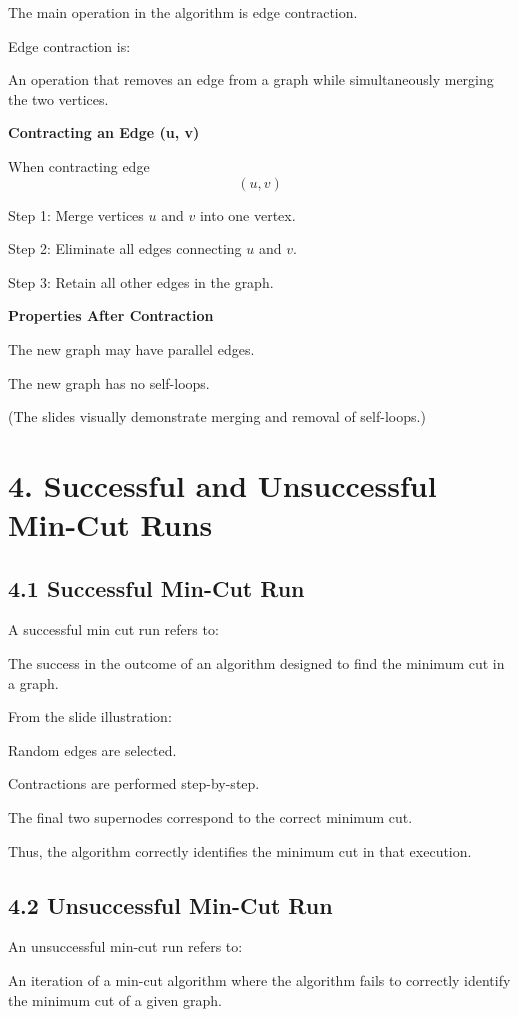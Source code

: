 \documentclass[11pt]{article}
\begin{document}
The main operation in the algorithm is edge contraction.

Edge contraction is:

An operation that removes an edge from a graph while simultaneously merging the two vertices.

\textbf{Contracting an Edge (u, v)}

When contracting edge
\[
(u,v)
\]

Step 1: Merge vertices $u$ and $v$ into one vertex.

Step 2: Eliminate all edges connecting $u$ and $v$.

Step 3: Retain all other edges in the graph.

\textbf{Properties After Contraction}

The new graph may have parallel edges.

The new graph has no self-loops.

(The slides visually demonstrate merging and removal of self-loops.)

\section*{4. Successful and Unsuccessful Min-Cut Runs}

\subsection*{4.1 Successful Min-Cut Run}

A successful min cut run refers to:

The success in the outcome of an algorithm designed to find the minimum cut in a graph.

From the slide illustration:

Random edges are selected.

Contractions are performed step-by-step.

The final two supernodes correspond to the correct minimum cut.

Thus, the algorithm correctly identifies the minimum cut in that execution.

\subsection*{4.2 Unsuccessful Min-Cut Run}

An unsuccessful min-cut run refers to:

An iteration of a min-cut algorithm where the algorithm fails to correctly identify the minimum cut of a given graph.
\end{document}
